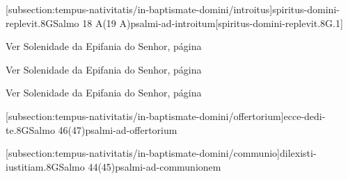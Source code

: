 \def\Prefix{subsection:tempus-nativitatis/in-baptismate-domini}

[\Prefix/introitus]{spiritus-domini-replevit.8G}{Salmo 18 A(19 A)}{psalmi-ad-introitum}[spiritus-domini-replevit.8G.1]

\begin{rubrica}
  Ver Solenidade da Epifania do Senhor, página~\pageref{subsection:tempus-nativitatis/in-epiphania-domini/psalmus-responsorius}
\end{rubrica}

\begin{rubrica}
  Ver Solenidade da Epifania do Senhor, página~\pageref{subsection:tempus-nativitatis/in-epiphania-domini/alleluia}
\end{rubrica}

\begin{rubrica}
  Ver Solenidade da Epifania do Senhor, página~\pageref{subsection:tempus-nativitatis/in-epiphania-domini/psalmus-alleluiaticus}
\end{rubrica}

\AllowPageFlush

[\Prefix/offertorium]{ecce-dedi-te.8G}{Salmo 46(47)}{psalmi-ad-offertorium}

\AllowPageBreak

[\Prefix/communio]{dilexisti-iustitiam.8G}{Salmo 44(45)}{psalmi-ad-communionem}